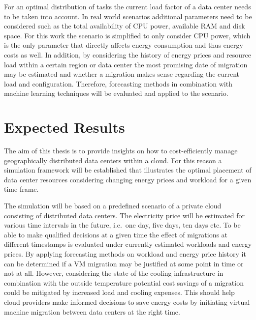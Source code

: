 \documentclass[a4paper]{article}
\begin{document}
For an optimal distribution of tasks the current load factor of a data center needs to be taken into account. In real world scenarios additional parameters need to be considered such as the total availability of CPU power, available RAM and disk space. For this work the scenario is simplified to only consider CPU power, which is the only parameter that directly affects energy consumption and thus energy costs as well. In addition, by considering the history of energy prices and resource load within a certain region or data center the most promising date of migration may be estimated and whether a migration makes sense regarding the current load and configuration. Therefore, forecasting methods in combination with machine learning techniques will be evaluated and applied to the scenario. 



\section{Expected Results}

The aim of this thesis is to provide insights on how to cost-efficiently manage geographically distributed data centers within a cloud. For this reason a simulation framework will be established that illustrates the optimal placement of data center resources considering changing energy prices and workload for a given time frame. 

The simulation will be based on a predefined scenario of a private cloud consisting of distributed data centers. The electricity price will be estimated for various time intervals in the future, i.e.\ one day, five days, ten days etc. To be able to make qualified decisions at a given time the effect of migrations at different timestamps is evaluated under currently estimated workloads and energy prices. By applying forecasting methods on workload and energy price history it can be determined if a VM migration may be justified at some point in time or not at all. However, considering the state of the cooling infrastructure in combination with the outside temperature potential cost savings of a migration could be mitigated by increased load and cooling expenses. This should help cloud providers make informed decisions to save energy costs by initiating virtual machine migration between data centers at the right time. 

\end{document}

